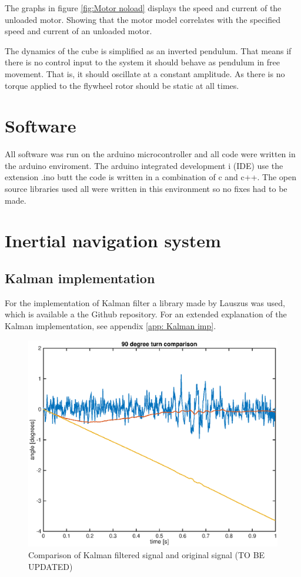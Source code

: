 \documentclass[a4paper,11pt]{kth-mag}
\begin{document}
The graphs in figure \ref{fig:Motor noload} displays the speed and current of the unloaded motor. Showing that the motor model correlates with the specified speed and current of an unloaded motor.

The dynamics of the cube is simplified as an inverted pendulum. That means if there is no control input to the system it should behave as pendulum in free movement. That is, it should oscillate at a constant amplitude. As there is no torque applied to the flywheel rotor should be static at all times.

\section{Software}
All software was run on the arduino microcontroller and all code were written in the arduino enviroment. The arduino integrated development i (IDE) use the extension .ino butt the code is written in a combination of c and c++. The open source libraries used all were written in this environment so no fixes had to be made. 

\section{Inertial navigation system}

\subsection{Kalman implementation}
For the implementation of Kalman filter a library made by Lauszus was used, which is available a the Github repository\cite{TKJkalman}. For an extended explanation of the Kalman implementation, see appendix \ref{app: Kalman imp}.

\begin{figure}[!htb]
\centering
\includegraphics[width = \textwidth]{Kalmancomparisonstat.eps}
\caption{Comparison of Kalman filtered signal and original signal (TO BE UPDATED)}
\label{Fig: Kalman comparison}
\end{figure}
\end{document}
